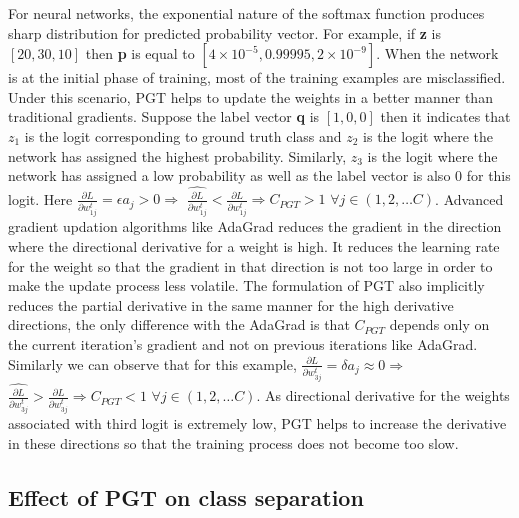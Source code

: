 \documentclass[runningheads]{llncs}
\begin{document}
For neural networks, the exponential nature of the softmax function produces sharp
distribution for predicted probability vector. For example, if \textbf{z} is $[20, 30,
10]$ then \textbf{p} is equal to $[4\times 10^{-5},  0.99995, 2\times10^{-9}]$. When the
network is at the initial phase of training, most of the training examples are
misclassified. Under this scenario, PGT helps to update the weights in a better manner
than traditional gradients. Suppose the label vector \textbf{q} is $[1, 0, 0]$ then it
indicates that $z_1$ is the logit corresponding to ground truth class and $z_2$ is the
logit where the network has assigned the highest probability. Similarly, $z_3$ is the
logit where the network has assigned a low probability as well as the label vector is
also $0$ for this logit. Here $\frac{\partial L}{\partial w_{1j}^{t}} = \epsilon a_j > 0
\Rightarrow$ $ \widehat{\frac{\partial L}{\partial w_{1j}^{t}}} < \frac{\partial
L}{\partial w_{1j}^{t}} \Rightarrow C_{PGT} > 1$ $\forall j \in (1, 2,\ldots C)$.
Advanced gradient updation algorithms like AdaGrad \cite{duchi2011adaptive} reduces the
gradient in the direction where the directional derivative for a weight is high. It
reduces the learning rate for the weight so that the gradient in that direction is not
too large in order to make the update process less volatile. The formulation of PGT also
implicitly reduces the partial derivative in the same manner for the high derivative
directions, the only difference with the AdaGrad is that $C_{PGT}$ depends only on the
current iteration's gradient and not on previous iterations like AdaGrad. Similarly we
can observe that for this example, $\frac{\partial L}{\partial w_{3j}^{t}} = \delta a_j
\approx 0 \Rightarrow$ $  \widehat{\frac{\partial L}{\partial w_{3j}^{t}}} >
\frac{\partial L}{\partial w_{3j}^{t}} \Rightarrow C_{PGT} < 1$ $\forall j \in (1,
2,\ldots C)$. As directional derivative for the weights associated with third logit is
extremely low, PGT helps to increase the derivative in these directions so that the
training process does not become too slow.

\subsection{Effect of PGT on class separation}
\label{sec:pgt_class_separation}
\end{document}
